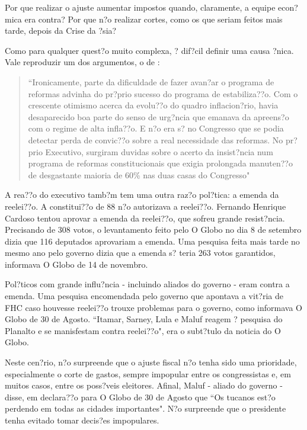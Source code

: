 \documentclass{article}
\begin{document}
Por que realizar o ajuste aumentar impostos quando, claramente, a equipe econ?mica era contra? Por que n?o realizar cortes, como os que seriam feitos mais tarde, depois da Crise da ?sia?

Como para qualquer quest?o muito complexa, ? dif?cil definir uma causa ?nica. Vale reproduzir um dos argumentos, o de \citet[p. 341]{Werneck2014}:

\begin{quote}
``Ironicamente, parte da dificuldade de fazer avan?ar o programa de reformas advinha do pr?prio sucesso do programa de estabiliza??o. Com o crescente otimismo acerca da evolu??o do quadro inflacion?rio, havia desaparecido boa parte do senso de urg?ncia que emanava da apreens?o com o regime de alta infla??o. E n?o era s? no Congresso que se podia detectar perda de convic??o sobre a real necessidade das reformas. No pr?prio Executivo, surgiram duvidas sobre o acerto da insist?ncia num programa de reformas constitucionais que exigia prolongada manuten??o de desgastante maioria de 60\% nas duas casas do Congresso"
\end{quote} 

A rea??o do executivo tamb?m tem uma outra raz?o pol?tica: a emenda da reelei??o. A constitui??o de 88 n?o autorizava a reelei??o. Fernando Henrique Cardoso tentou aprovar a emenda da reelei??o, que sofreu grande resist?ncia. Precisando de 308 votos, o levantamento feito pelo O Globo no dia 8 de setembro dizia que 116 deputados aprovariam a emenda. Uma pesquisa feita mais tarde no mesmo ano pelo governo dizia que a emenda s? teria 263 votos garantidos, informava O Globo de 14 de novembro.

Pol?ticos com grande influ?ncia - incluindo aliados do governo - eram contra a emenda. Uma pesquisa encomendada pelo governo que apontava a vit?ria de FHC caso houvesse reelei??o trouxe problemas para o governo, como informava O Globo de 30 de Agosto. ``Itamar, Sarney, Lula e Maluf reagem ? pesquisa do Planalto e se manisfestam contra reelei??o", era o subt?tulo da noticia do O Globo.

Neste cen?rio, n?o surpreende que o ajuste fiscal n?o tenha sido uma prioridade, especialmente o corte de gastos, sempre impopular entre os congressistas e, em muitos casos, entre os poss?veis eleitores. Afinal, Maluf - aliado do governo - disse, em declara??o para O Globo de 30 de Agosto que ``Os tucanos est?o perdendo em todas as cidades importantes". N?o surpreende que o presidente tenha evitado tomar decis?es impopulares.
\end{document}
